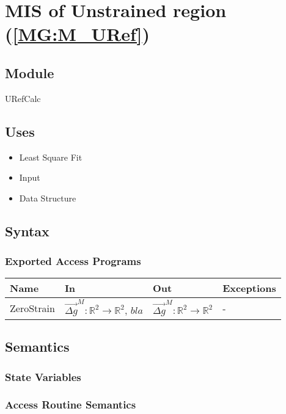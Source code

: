 \documentclass[12pt, titlepage]{article}
\begin{document}
\section{MIS of Unstrained region (\texorpdfstring{\cref{MG:M_URef}}))} \label{MIS_URef}

\subsection{Module}
URefCalc
\subsection{Uses}
\begin{itemize}
\item Least Square Fit
\item Input
\item Data Structure
\end{itemize}

\subsection{Syntax}

\subsubsection{Exported Access Programs}

\begin{center}
\begin{tabular}{p{2cm} p{4cm} p{4cm} p{2cm}}
\hline
\textbf{Name} & \textbf{In} & \textbf{Out} & \textbf{Exceptions} \\
\hline
ZeroStrain & $\overrightarrow{\Delta g}^M:\mathbb{R}^2\rightarrow\mathbb{R}^2$, $bla$  & $\overrightarrow{\Delta g}^M:\mathbb{R}^2\rightarrow\mathbb{R}^2$ & - \\
\hline
\end{tabular}
\end{center}

\subsection{Semantics}

\subsubsection{State Variables}


\subsubsection{Access Routine Semantics}
\end{document}
